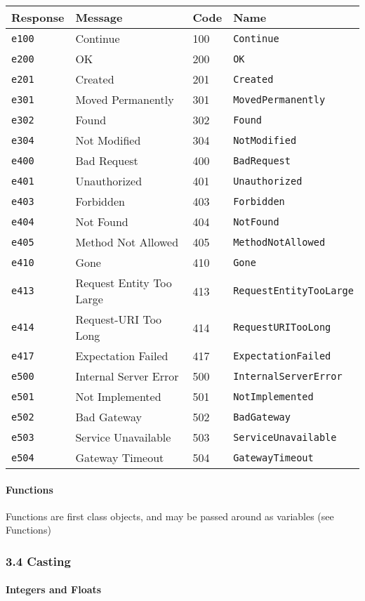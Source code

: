 \documentclass[]{article}
\begin{document}
\begin{longtable}[c]{@{}llll@{}}
\toprule
Response & Message & Code & Name\tabularnewline
\midrule
\endhead
\texttt{e100} & Continue & 100 & \texttt{Continue}\tabularnewline
\texttt{e200} & OK & 200 & \texttt{OK}\tabularnewline
\texttt{e201} & Created & 201 & \texttt{Created}\tabularnewline
\texttt{e301} & Moved Permanently & 301 &
\texttt{MovedPermanently}\tabularnewline
\texttt{e302} & Found & 302 & \texttt{Found}\tabularnewline
\texttt{e304} & Not Modified & 304 & \texttt{NotModified}\tabularnewline
\texttt{e400} & Bad Request & 400 & \texttt{BadRequest}\tabularnewline
\texttt{e401} & Unauthorized & 401 &
\texttt{Unauthorized}\tabularnewline
\texttt{e403} & Forbidden & 403 & \texttt{Forbidden}\tabularnewline
\texttt{e404} & Not Found & 404 & \texttt{NotFound}\tabularnewline
\texttt{e405} & Method Not Allowed & 405 &
\texttt{MethodNotAllowed}\tabularnewline
\texttt{e410} & Gone & 410 & \texttt{Gone}\tabularnewline
\texttt{e413} & Request Entity Too Large & 413 &
\texttt{RequestEntityTooLarge}\tabularnewline
\texttt{e414} & Request-URI Too Long & 414 &
\texttt{RequestURITooLong}\tabularnewline
\texttt{e417} & Expectation Failed & 417 &
\texttt{ExpectationFailed}\tabularnewline
\texttt{e500} & Internal Server Error & 500 &
\texttt{InternalServerError}\tabularnewline
\texttt{e501} & Not Implemented & 501 &
\texttt{NotImplemented}\tabularnewline
\texttt{e502} & Bad Gateway & 502 & \texttt{BadGateway}\tabularnewline
\texttt{e503} & Service Unavailable & 503 &
\texttt{ServiceUnavailable}\tabularnewline
\texttt{e504} & Gateway Timeout & 504 &
\texttt{GatewayTimeout}\tabularnewline
\bottomrule
\end{longtable}

\paragraph{Functions}\label{functions}

Functions are first class objects, and may be passed around as variables
(see Functions)

\subsubsection{3.4 Casting}\label{casting}

\paragraph{Integers and Floats}\label{integers-and-floats}
\end{document}
